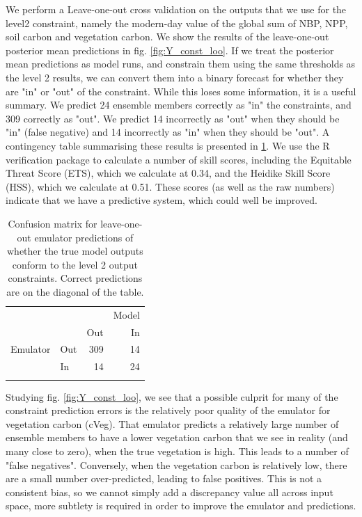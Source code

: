 \documentclass[gmd, manuscript]{copernicus}
\begin{document}
We perform a Leave-one-out cross validation on the outputs that we use for the level2 constraint, namely the modern-day value of the global sum of NBP, NPP, soil carbon and vegetation carbon. We show the results of the leave-one-out posterior mean predictions in fig. \ref{fig:Y_const_loo}. If we treat the posterior mean predictions as model runs, and constrain them using the same thresholds as the level 2 results, we can convert them into a binary forecast for whether they are "in" or "out" of the constraint. While this loses some information, it is a useful summary. We predict 24 ensemble members correctly as "in" the constraints, and 309 correctly as "out". We predict 14 incorrectly as "out" when they should be "in" (false negative) and 14 incorrectly as "in" when they should be "out". A contingency table summarising these results is presented in \ref{table:level_2_contingency}. We use the R verification package \cite{R2015verification} to calculate a number of skill scores, including the Equitable Threat Score (ETS), which we calculate at 0.34, and the Heidike Skill Score (HSS), which we calculate at 0.51. These scores (as well as the raw numbers) indicate that we have a predictive system, which could well be improved.

\begin{table}[ht]
\caption{Confusion matrix for leave-one-out emulator predictions of whether the true model outputs conform to the level 2 output constraints. Correct predictions are on the diagonal of the table.}
\label{table:level_2_contingency}
\begin{tabular}{l l r r}
\tophline
 &  &  & Model \\ 
& & Out &  In\\
Emulator & Out & 309 &  14 \\
 & In & 14 & 24 \\

\bottomhline
\end{tabular}
\belowtable{} %

\end{table}

Studying fig. \ref{fig:Y_const_loo}, we see that a possible culprit for many of the constraint prediction errors is the relatively poor quality of the emulator for vegetation carbon (cVeg). That emulator predicts a relatively large number of ensemble members to have a lower vegetation carbon that we see in reality (and many close to zero), when the true vegetation is high. This leads to a number of "false negatives". Conversely, when the vegetation carbon is relatively low, there are a small number over-predicted, leading to false positives. This is not a consistent bias, so we cannot simply add a discrepancy value all across input space, more subtlety is required in order to improve the emulator and predictions.
\end{document}
